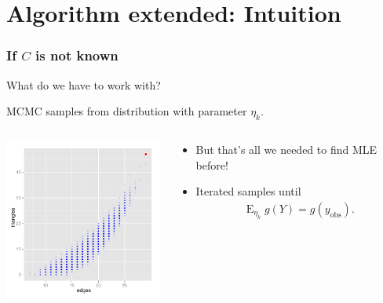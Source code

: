 \documentclass[ 10pt]{beamer}
\DeclareMathOperator{\E}{E}
\newcommand{\etaLCM}{\hat{\eta}_{\textrm{LCM}}}
\newcommand{\yobs}{y_{\text{obs}}}
\begin{document}
\section{Algorithm extended: Intuition}
\frame
{
\frametitle{If $C$ is not known}
What do we have to work with?
\vspace{4mm}

MCMC samples from distribution with parameter $\eta_k$.  

\vspace{1ex}

\begin{columns}[t]
\begin{column}[T]{0.39\textwidth}
\includegraphics[width=2.15in]{MCsample-bare}
\end{column}

\begin{column}[r]{0.61\textwidth}
\pause

\begin{itemize}
\item But that's all we needed to find MLE before! 
\vspace{1mm}


\item Iterated samples %
until %
\begin{align*}
	\E_{\eta_k} g(Y) = g(\yobs).
\end{align*}

\end{itemize}
\end{column}
\end{columns}
}
\end{document}
